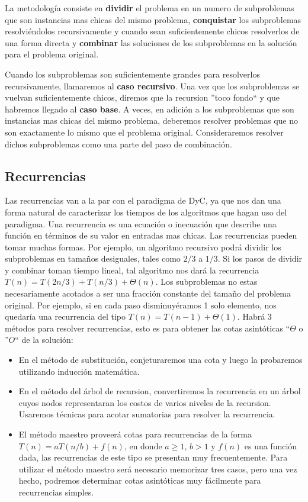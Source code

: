 \documentclass[10pt, a4paper]{report}
\begin{document}
La metodolog\'ia consiste en \textbf{dividir} el problema en un numero de subproblemas que son instancias mas chicas del mismo problema, \textbf{conquistar} los subproblemas resolvi\'endolos recursivamente y cuando sean suficientemente chicos resolverlos de una forma directa y \textbf{combinar} las soluciones de los subproblemas en la soluci\'on para el problema original.

Cuando los subproblemas son suficientemente grandes para resolverlos recursivamente, llamaremos al \textbf{caso recursivo}. Una vez que los subproblemas se vuelvan suficientemente chicos, diremos que la recursion ''toco fondo`` y que habremos llegado al \textbf{caso base}. A veces, en adici\'on a los subproblemas que son instancias mas chicas del mismo problema, deberemos resolver problemas que no son exactamente lo mismo que el problema original. Consideraremos resolver dichos subproblemas como una parte del paso de combinaci\'on.

\subsection{Recurrencias}

Las recurrencias van a la par con el paradigma de DyC, ya que nos dan una forma natural de caracterizar los tiempos de los algoritmos que hagan uso del paradigma. Una recurrencia es una ecuaci\'on o inecuaci\'on que describe una funci\'on en t\'erminos de su valor en entradas mas chicas. Las recurrencias pueden tomar muchas formas. Por ejemplo, un algoritmo recursivo podr\'a dividir los subproblemas en tama\~nos desiguales, tales como $2/3$ a $1/3$. Si los pasos de dividir y combinar toman tiempo lineal, tal algoritmo nos dar\'a la recurrencia $T(n) = T(2n/3) + T(n/3) + \Theta(n)$. Los subproblemas no estas necesariamente acotados a ser una fracci\'on constante del tama\~no del problema original. Por ejemplo, si en cada paso disminuy\'eramos 1 solo elemento, nos quedar\'ia una recurrencia del tipo $T(n) = T(n-1) + \Theta(1)$. Habr\'a 3 m\'etodos para resolver recurrencias, esto es para obtener las cotas asint\'oticas ``$\Theta$ o ''$O$`` de la soluci\'on:

\begin{itemize}
 \item En el m\'etodo de substituci\'on, conjeturaremos una cota y luego la probaremos utilizando inducci\'on matem\'atica.
 \item En el m\'etodo del \'arbol de recursion, convertiremos la recurrencia en un \'arbol cuyos nodos representaran los costos de varios niveles de la recursion. Usaremos t\'ecnicas para acotar sumatorias para resolver la recurrencia.
 \item El m\'etodo maestro proveer\'a cotas para recurrencias de la forma $T(n) = aT(n/b) + f(n)$, en donde $a \geq 1$, $b > 1$ y $f(n)$ es una funci\'on dada, las recurrencias de este tipo se presentan muy frecuentemente. Para utilizar el m\'etodo maestro ser\'a necesario memorizar tres casos, pero una vez hecho, podremos determinar cotas asint\'oticas muy f\'acilmente para recurrencias simples.
\end{itemize}
\end{document}
